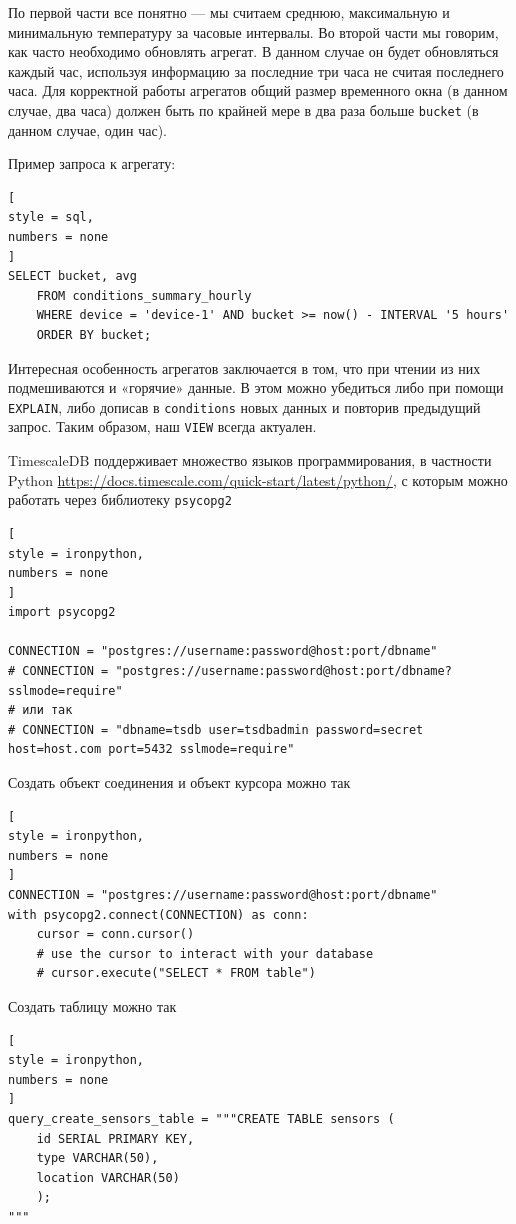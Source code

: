 \documentclass[%
	11pt,
	a4paper,
	utf8,
		]{article}
\begin{document}
По первой части все понятно — мы считаем среднюю, максимальную и минимальную температуру за часовые интервалы. Во второй части мы говорим, как часто необходимо обновлять агрегат. В данном случае он будет обновляться каждый час, используя информацию за последние три часа не считая последнего часа. Для корректной работы агрегатов общий размер временного окна (в данном случае, два часа) должен быть по крайней мере в два раза больше \verb|bucket| (в данном случае, один час).

Пример запроса к агрегату:
\begin{lstlisting}[
style = sql,
numbers = none
]
SELECT bucket, avg
	FROM conditions_summary_hourly
	WHERE device = 'device-1' AND bucket >= now() - INTERVAL '5 hours'
	ORDER BY bucket;
\end{lstlisting}

Интересная особенность агрегатов заключается в том, что при чтении из них подмешиваются и «горячие» данные. В этом можно убедиться либо при помощи \verb|EXPLAIN|, либо дописав в \verb|conditions| новых данных и повторив предыдущий запрос. Таким образом, наш \verb|VIEW| всегда актуален.










TimescaleDB поддерживает множество языков программирования, в частности Python \url{https://docs.timescale.com/quick-start/latest/python/}, с которым можно работать через библиотеку \verb|psycopg2|
\begin{lstlisting}[
style = ironpython,
numbers = none
]
import psycopg2

CONNECTION = "postgres://username:password@host:port/dbname"
# CONNECTION = "postgres://username:password@host:port/dbname?sslmode=require"
# или так
# CONNECTION = "dbname=tsdb user=tsdbadmin password=secret host=host.com port=5432 sslmode=require"
\end{lstlisting}

Создать объект соединения и объект курсора можно так
\begin{lstlisting}[
style = ironpython,
numbers = none
]
CONNECTION = "postgres://username:password@host:port/dbname"
with psycopg2.connect(CONNECTION) as conn:
	cursor = conn.cursor()
	# use the cursor to interact with your database
	# cursor.execute("SELECT * FROM table")
\end{lstlisting}

Создать таблицу можно так
\begin{lstlisting}[
style = ironpython,
numbers = none
]
query_create_sensors_table = """CREATE TABLE sensors (
	id SERIAL PRIMARY KEY,
	type VARCHAR(50),
	location VARCHAR(50)
	);
"""
\end{lstlisting}
\end{document}
